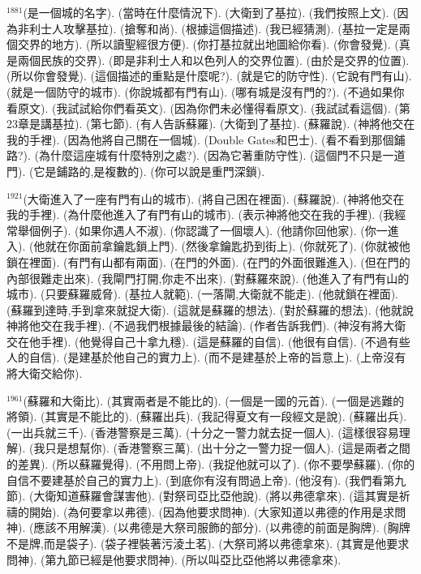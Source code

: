 \documentclass{book}
\begin{document}
$^{1881}$(是一個城的名字).
(當時在什麼情況下).
(大衛到了基拉).
(我們按照上文).
(因為非利士人攻擊基拉).
(搶奪和尚).
(根據這個描述).
(我已經猜測).
(基拉一定是兩個交界的地方).
(所以讀聖經很方便).
(你打基拉就出地圖給你看).
(你會發覺).
(真是兩個民族的交界).
(即是非利士人和以色列人的交界位置).
(由於是交界的位置).
(所以你會發覺).
(這個描述的重點是什麼呢?).
(就是它的防守性).
(它說有門有山).
(就是一個防守的城市).
(你說城都有門有山).
(哪有城是沒有門的?).
(不過如果你看原文).
(我試試給你們看英文).
(因為你們未必懂得看原文).
(我試試看這個).
(第23章是講基拉).
(第七節).
(有人告訴蘇羅).
(大衛到了基拉).
(蘇羅說).
(神將他交在我的手裡).
(因為他將自己關在一個城).
(Double Gates和巴士).
(看不看到那個鋪路?).
(為什麼這座城有什麼特別之處?).
(因為它著重防守性).
(這個門不只是一道門).
(它是鋪路的,是複數的).
(你可以說是重門深鎖).

$^{1921}$(大衛進入了一座有門有山的城市).
(將自己困在裡面).
(蘇羅說).
(神將他交在我的手裡).
(為什麼他進入了有門有山的城市).
(表示神將他交在我的手裡).
(我經常舉個例子).
(如果你遇人不淑).
(你認識了一個壞人).
(他請你回他家).
(你一進入).
(他就在你面前拿鑰匙鎖上門).
(然後拿鑰匙扔到街上).
(你就死了).
(你就被他鎖在裡面).
(有門有山都有兩面).
(在門的外面).
(在門的外面很難進入).
(但在門的內部很難走出來).
(我閘門打開,你走不出來).
(對蘇羅來說).
(他進入了有門有山的城市).
(只要蘇羅威脅).
(基拉人就範).
(一落閘,大衛就不能走).
(他就鎖在裡面).
(蘇羅到達時,手到拿來就捉大衛).
(這就是蘇羅的想法).
(對於蘇羅的想法).
(他就說神將他交在我手裡).
(不過我們根據最後的結論).
(作者告訴我們).
(神沒有將大衛交在他手裡).
(他覺得自己十拿九穩).
(這是蘇羅的自信).
(他很有自信).
(不過有些人的自信).
(是建基於他自己的實力上).
(而不是建基於上帝的旨意上).
(上帝沒有將大衛交給你).

$^{1961}$(蘇羅和大衛比).
(其實兩者是不能比的).
(一個是一國的元首).
(一個是逃難的將領).
(其實是不能比的).
(蘇羅出兵).
(我記得夏文有一段經文是說).
(蘇羅出兵).
(一出兵就三千).
(香港警察是三萬).
(十分之一警力就去捉一個人).
(這樣很容易理解).
(我只是想幫你).
(香港警察三萬).
(出十分之一警力捉一個人).
(這是兩者之間的差異).
(所以蘇羅覺得).
(不用問上帝).
(我捉他就可以了).
(你不要學蘇羅).
(你的自信不要建基於自己的實力上).
(到底你有沒有問過上帝).
(他沒有).
(我們看第九節).
(大衛知道蘇羅會謀害他).
(對祭司亞比亞他說).
(將以弗德拿來).
(這其實是祈禱的開始).
(為何要拿以弗德).
(因為他要求問神).
(大家知道以弗德的作用是求問神).
(應該不用解漢).
(以弗德是大祭司服飾的部分).
(以弗德的前面是胸牌).
(胸牌不是牌,而是袋子).
(袋子裡裝著污淩土茗).
(大祭司將以弗德拿來).
(其實是他要求問神).
(第九節已經是他要求問神).
(所以叫亞比亞他將以弗德拿來).
\end{document}
